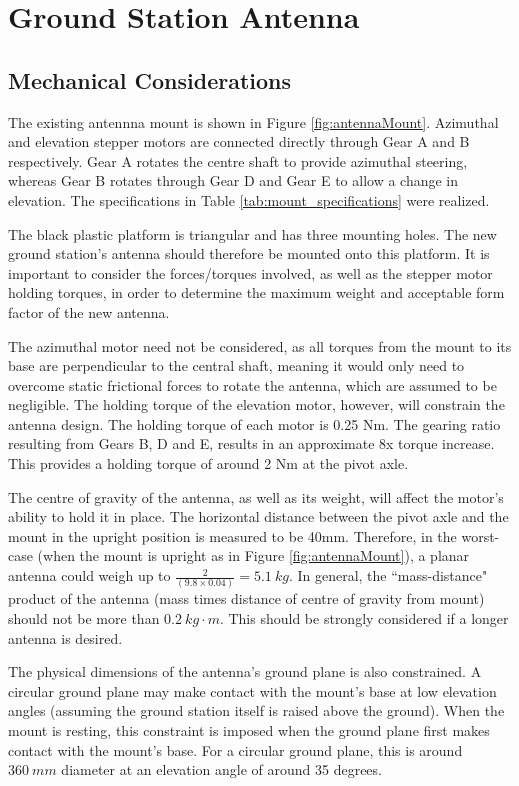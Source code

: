 \graphicspath{{./figures}}

\section{Ground Station Antenna}
\subsection{Mechanical Considerations}

The existing antennna mount is shown in Figure \ref{fig:antennaMount}. Azimuthal and elevation stepper motors are connected directly through Gear A and B respectively. Gear A rotates the centre shaft to provide azimuthal steering, whereas Gear B rotates through Gear D and Gear E to allow a change in elevation. The 
specifications in Table \ref{tab:mount_specifications} were realized.

The black plastic platform is triangular and has three mounting holes. The new ground station's antenna should therefore be mounted onto this platform. It is important to consider the forces/torques involved, as well as the stepper motor holding torques, in order to determine the maximum weight and acceptable form factor of the new antenna.

The azimuthal motor need not be considered, as all torques from the mount to its base are perpendicular to the central shaft, meaning it would only need to overcome static frictional forces to rotate the antenna, which are assumed to be negligible. The holding torque of the elevation motor, however, will constrain the antenna design. The holding torque of each motor is 0.25 Nm. The gearing ratio resulting from Gears B, D and E, results in an approximate 8x torque increase. This provides a holding torque of around 2 Nm at the pivot axle.

The centre of gravity of the antenna, as well as its weight, will affect the motor's ability to hold it in place. The horizontal distance between the pivot axle and the mount in the upright position is measured to be 40mm. Therefore, in the worst-case (when the mount is upright as in Figure \ref{fig:antennaMount}), a planar antenna could weigh up to $\frac{2}{(9.8 \times 0.04)} = \SI{5.1}{kg}$. In general, the ``mass-distance" product of the antenna (mass times distance of centre of gravity from mount) should not be more than $\SI{0.2}{kg \cdot m}$. This should be strongly considered if a longer antenna is desired.

The physical dimensions of the antenna's ground plane is also constrained. A circular ground plane may make contact with the mount's base at low elevation angles (assuming the ground station itself is raised above the ground). When the mount is resting, this constraint is imposed when the ground plane first makes contact with the mount's base. For a circular ground plane, this is around $\SI{360}{mm}$ diameter at an elevation angle of around 35 degrees.

